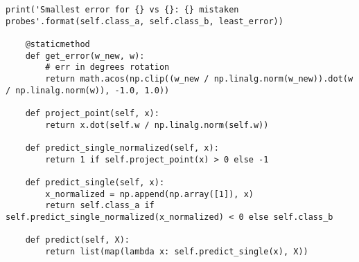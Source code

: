 \begin{lstlisting}[style=py]
        print('Smallest error for {} vs {}: {} mistaken probes'.format(self.class_a, self.class_b, least_error))

    @staticmethod
    def get_error(w_new, w):
        # err in degrees rotation
        return math.acos(np.clip((w_new / np.linalg.norm(w_new)).dot(w / np.linalg.norm(w)), -1.0, 1.0))

    def project_point(self, x):
        return x.dot(self.w / np.linalg.norm(self.w))

    def predict_single_normalized(self, x):
        return 1 if self.project_point(x) > 0 else -1

    def predict_single(self, x):
        x_normalized = np.append(np.array([1]), x)
        return self.class_a if self.predict_single_normalized(x_normalized) < 0 else self.class_b

    def predict(self, X):
        return list(map(lambda x: self.predict_single(x), X))


\end{lstlisting}



